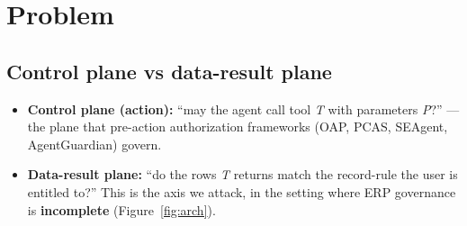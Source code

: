 \documentclass[11pt,a4paper]{article}
\begin{document}
\begin{abstract}
The contribution is scoped honestly to \textbf{applied security + benchmark + reference implementation} for an
under-served setting (ERP record-rule governance that is incomplete on child models), not to a novel
unification of authorization and integrity (prior art) nor to novel soundness on arbitrary policy domains.
\end{abstract}

\section{Problem}

\subsection{Control plane vs data-result plane}
\begin{itemize}[leftmargin=*]
  \item \textbf{Control plane (action):} ``may the agent call tool \emph{T} with parameters \emph{P}?'' ---
        the plane that pre-action authorization frameworks (OAP, PCAS, SEAgent, AgentGuardian) govern.
  \item \textbf{Data-result plane:} ``do the rows \emph{T} returns match the record-rule the user is entitled
        to?'' This is the axis we attack, in the setting where ERP governance is \textbf{incomplete}
        (Figure~\ref{fig:arch}).
\end{itemize}
\end{document}
